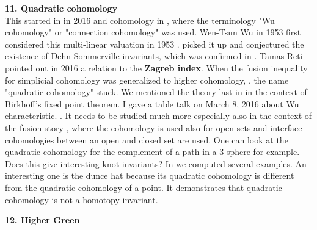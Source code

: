 \documentclass[12pt]{amsart}
\begin{document}
{\bf 11. Quadratic cohomology} \\

This started in \cite{valuation} in 2016 and cohomology in \cite{CohomologyWu},
where the terminology "Wu cohomology" or "connection cohomology" was used.
Wen-Tsun Wu in 1953 first considered this multi-linear valuation in 1953 \cite{Wu1953}.
\cite{Gruenbaum1970} picked it up and conjectured the existence of Dehn-Sommerville
invariants, which was confirmed in \cite{valuation}.
Tamas Reti pointed out in 2016 a relation to the {\bf Zagreb index}.
When the fusion inequality for simplicial cohomology \cite{fusion1} was generalized
to higher cohomology, \cite{fusion2}, the name "quadratic cohomology" stuck.
We mentioned the theory last in \cite{ConnectionDirac} in the context of Birkhoff's
fixed point theorem.
I gave a table talk on March 8, 2016 about Wu characteristic.
\cite{KnillWuCharacteristic}.
It needs to be studied much more especially also in the context of the fusion 
story \cite{fusion1,fusion2},
where the cohomology is used also for open sets and interface cohomologies between
an open and closed set are used. One can look at the quadratic cohomology for the 
complement of a path in a 3-sphere for example. Does this give interesting 
knot invariants?  In \cite{CohomologyWu} we computed several examples. An interesting
one is the dunce hat because its quadratic cohomology is different from the quadratic
cohomology of a point. It demonstrates that quadratic cohomology is not a homotopy
invariant. 

{\bf 12. Higher Green}  \\
\end{document}
